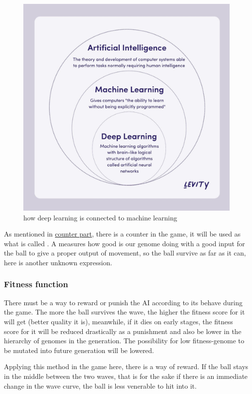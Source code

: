 \begin{figure}[H]
	\centering
	\includegraphics[width=0.7\linewidth]{"usedImages/AI vs Machine Learning vs Deep Learning"}
	\caption{how deep learning is connected to machine learning}
	\label{fig:ai-vs-machine-learning-vs-deep-learning}
\end{figure}

As mentioned in \hyperref[display-score]{counter part}, there is a counter in the game, it will be used as what is called . A  measures how good is our genome doing with a good input for the ball to give a proper output of movement, so the ball survive as far as it can, here is another unknown expression.
 
\subsubsection{Fitness function}
There must be a way to reward or punish the AI according to its behave during the game. The more the ball survives the wave, the higher the fitness score for it will get (better quality it is), meanwhile, if it dies on early stages, the fitness score for it will be reduced drastically as a punishment and also be lower in the hierarchy of genomes in the generation. The possibility for low fitness-genome to be mutated into future generation will be lowered.

Applying this method in the game here, there is a way of reward. If the ball stays in the middle between the two waves, that is for the sake if there is an immediate change in the wave curve, the ball is less venerable to hit into it.

